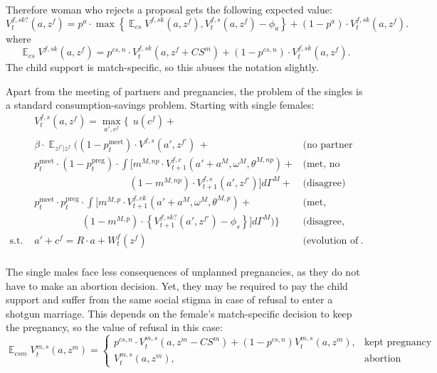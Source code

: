 \documentclass[12pt,letter]{article}
\DeclareMathOperator{\E}{\mathbb{E}}
\begin{document}
Therefore woman who rejects a proposal gets the following expected value:
\begin{equation}\label{sm-value}V^{f,sk?}_t(a,z^f) = p^{a}\cdot \max\left\{\E_{cs} V^{f,sk}(a,z^f), V^{f,s}_t(a,z^f) - \phi_a\right\} + (1-p^{a})\cdot V^{f,sk}_t(a,z^f).\end{equation}
where
\begin{equation} \E_{cs} V^{f,sk}(a,z^f) = p^{cs,n}\cdot V^{f,sk}_t(a,z^f+CS^m) + (1-p^{cs,n}) \cdot V^{f,sk}_t(a,z^f).
\end{equation}
The child support is match-specific, so this abuses the notation slightly.

Apart from the meeting of partners and pregnancies, the problem of the singles is a standard consumption-savings problem. Starting with single females:
\begin{align} & V_t^{f,s}(a,z^f)  = \max\limits_{a',c^f} \Bigg\{ \ \ u(c^f) +  \\\nonumber &  \beta\cdot \E_{z^{f\prime}|z^f} \Bigg( (1-p^{\text{meet}}_t)\cdot V^{f,s}(a',z^{f\prime}) \,+ & \text{(no partner met)}\\\nonumber
 & p^{\text{meet}}_t\cdot (1-p^{\text{preg}}_t) \cdot \int \Big[m^{M,np}\cdot V^{f,c}_{t+1}(a'+a^M,\omega^M,\theta^{M,np}) + & \text{(met, no pregnancy, agree)}\\\nonumber
 &\hspace{4cm}(1-m^{M,np})\cdot V^{f,s}_{t+1}(a',z^{f\prime}) \Big]d\Gamma^M + & \text{(disagree)} \\\nonumber
 & p^{\text{meet}}_t\cdot p^{\text{preg}}_t \cdot \int \Big[m^{M,p}\cdot V^{f,ck}_{t+1}(a'+a^M,\omega^M,\theta^{M,p})+  & \text{(met, shotgun marriage)}\\\nonumber
 &\hspace{2cm} (1-m^{M,p})\cdot \left\{V^{f,sk?}_{t+1}(a',z^{f\prime}) - \phi_s\right\} \Big]d\Gamma^M\Bigg) \Bigg\} & \text{(disagree, social stigma)}\\\nonumber
 \text{s.t. \ } & a' + c^f = R\cdot a  + W^f_t(z^f) & \text{(evolution of the assets)}.\\\nonumber
\end{align}

The single males face less consequences of unplanned pregnancies, as they do not have to make an abortion decision. Yet, they may be required to pay the child support and suffer from the same social stigma in case of refusal to enter a shotgun marriage. This depends on the female's match-specific decision to keep the pregnancy, so the value of refusal in this case:
\begin{equation}\label{man-cs}\E_{csm} V^{m,s}_{t}(a,z^{m}) = \begin{cases}p^{cs,n} \cdot V^{m,s}_{t}(a,z^{m}-CS^m)  + (1-p^{cs,n}) V^{m,s}_{t}(a,z^{m}), & \text{kept pregnancy}\\
  V^{m,s}_{t}(a,z^{m}), & \text{abortion}\end{cases}\end{equation}
\end{document}
